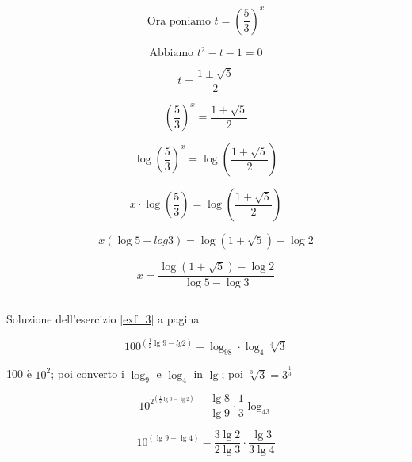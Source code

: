 \begin{equation*}
\textrm{Ora poniamo } t=\left( \frac{5}{3} \right)^x
\end{equation*}


\begin{equation*}
\textrm{Abbiamo } t^2-t-1=0
\end{equation*}

\begin{equation*}
t=\frac{ 1\pm \sqrt{5} }{2 }
\end{equation*}

\begin{equation*}
\left( \frac{5}{3} \right)^x=\frac{ 1+ \sqrt{5} }{2 }
\end{equation*}

\begin{equation*}
\log\left( \frac{5}{3} \right)^x=\log\left(\frac{ 1+ \sqrt{5} }{2 }\right)
\end{equation*}

\begin{equation*}
x\cdot \log\left( \frac{5}{3} \right)=\log\left(\frac{ 1+ \sqrt{5} }{2 }\right)
\end{equation*}

\begin{equation*}
x(\log5-log3)=\log(1+\sqrt 5)-\log2
\end{equation*}

\begin{equation*}
x=\frac
{\log(1+\sqrt 5)-\log2}
{\log5-\log3}
\end{equation*}


\vspace{1cm}
\hrule
\vspace{1cm}



Soluzione dell'esercizio \ref{exf_3} a pagina \pageref{exf_3}\label{solf_3}

\begin{equation*}
100^{\left(\frac{1}{2}\lg9-lg2\right)}-\log_98\cdot\log_4\sqrt[3]{3}
\end{equation*}

100 è $10^2$; poi converto i $\log_9$ e $\log_4$ in $\lg$; poi $\sqrt[3]{3}=3^{\frac{1}{3}}$

\begin{equation*}
10^{2^{\left(\frac{1}{2}\lg9-\lg2\right)}}-\frac{\lg8}{\lg9}\cdot\frac{1}{3}\log_43
\end{equation*}

\begin{equation*}
10^{\left(\lg9-\lg4\right)}-\frac{3\lg2}{2\lg3}\cdot\frac{\lg3}{3\lg4}
\end{equation*}

